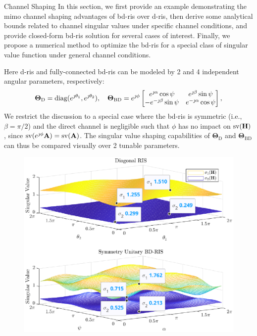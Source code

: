 \documentclass[journal]{IEEEtran}
\begin{document}
\begin{section}{Channel Shaping}
	In this section, we first provide an example demonstrating the \gls{mimo} channel shaping advantages of \gls{bd}-\gls{ris} over \gls{d}-\gls{ris}, then derive some analytical bounds related to channel singular values under specific channel conditions, and provide closed-form \gls{bd}-\gls{ris} solution for several cases of interest.
	Finally, we propose a numerical method to optimize the \gls{bd}-\gls{ris} for a special class of singular value function under general channel conditions.

	\begin{example}
		\label{eg:shaping_potential}
		Here \gls{d}-\gls{ris} and fully-connected \gls{bd}-\gls{ris} can be modeled by 2 and 4 independent angular parameters, respectively:
		\begin{equation*}
			\mathbf{\Theta}_\mathrm{D} = \operatorname{diag}(e^{\jmath \theta_1}, e^{\jmath \theta_2}), \quad
			\mathbf{\Theta}_\mathrm{BD} = e^{\jmath \phi} \begin{bmatrix}
				e^{\jmath \alpha} \cos \psi  & e^{\jmath \beta} \sin \psi   \\
				-e^{-\jmath \beta} \sin \psi & e^{-\jmath \alpha} \cos \psi
			\end{bmatrix},
		\end{equation*}
		We restrict the discussion to a special case where the \gls{bd}-\gls{ris} is symmetric (i.e., $\beta = \pi / 2$) and the direct channel is negligible such that $\phi$ has no impact on $\operatorname{sv}(\mathbf{H})$, since $\operatorname{sv}(e^{\jmath \phi} \mathbf{A}) = \operatorname{sv}(\mathbf{A})$.
		The singular value shaping capabilities of $\mathbf{\Theta}_\mathrm{D}$ and $\mathbf{\Theta}_\mathrm{BD}$ can thus be compared visually over 2 tunable parameters.
		\begin{figure}
			\centering
			\includegraphics[width=\columnwidth]{../assets/simulation/pc_singular_trend.eps}

\end{figure}
\end{example}
\end{section}
\end{document}
